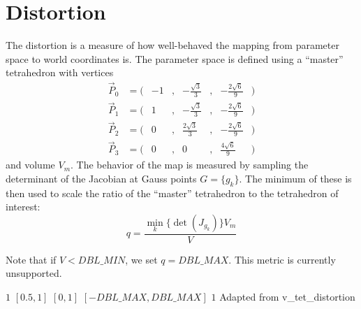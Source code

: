 \section{Distortion}

The distortion is a measure of how well-behaved the mapping from
parameter space to world coordinates is.
The parameter space is defined using a ``master'' tetrahedron
with vertices
\[
\begin{array}{lcrcrcrc}
 \vec P_0 &= (& -1&,& -\frac{ \sqrt{3}}{3}&,& -\frac{2\sqrt{6}}{9}&)\\
 \vec P_1 &= (&  1&,& -\frac{ \sqrt{3}}{3}&,& -\frac{2\sqrt{6}}{9}&)\\
 \vec P_2 &= (&  0&,&  \frac{2\sqrt{3}}{3}&,& -\frac{2\sqrt{6}}{9}&)\\
 \vec P_3 &= (&  0&,&                    0&,&  \frac{4\sqrt{6}}{9}&)
\end{array}
\]
and volume $V_m$.
The behavior of the map is measured by sampling the determinant of the
Jacobian at Gauss points $G = \{g_k\}$.
The minimum of these is then used to scale the ratio of the
``master'' tetrahedron to the tetrahedron of interest:
\[
q = \frac{\min_k\{\det(J_{g_k})\} V_m}{V}
\]

Note that if $V < DBL\_MIN$, we set $q = DBL\_MAX$.
This metric is currently unsupported.

%
{$1$}%
{$[0.5,1]$}%
{$[0,1]$}%
{$[-DBL\_MAX,DBL\_MAX]$}%
{$1$}%
{Adapted from \cite{ideas:xx}}%
{v\_tet\_distortion}%

